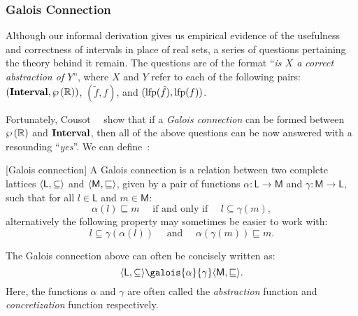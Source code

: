 \subsubsection{Galois Connection}
\label{bg:ssub:galois}

Although our informal derivation gives us empirical evidence of the usefulness
and correctness of intervals in place of real sets, a series of questions
pertaining the theory behind it remain.  The questions are of the format
``\emph{is $X$ a correct abstraction of $Y$}'', where $X$ and $Y$ refer to each
of the following pairs: $(\mathbf{Interval}, \wp\left({\mathbb{R}}\right))$, $(\tilde{f},
f)$, and $(\operatorname{\mathrm{lfp}} (\tilde{f}), \operatorname{\mathrm{lfp}} (f))$.

Fortunately, Cousot~\etal~\cite{cousot77} show that if a \emph{Galois
connection} can be formed between $\wp\left({\mathbb{R}}\right)$ and $\mathbf{Interval}$,
then all of the above questions can be now answered with a resounding
``\emph{yes}''.  We can define~\cite{nielson99}:
\begin{definition}
    \textup{[Galois connection]}
    A Galois connection is a relation between two complete lattices
    $\langle{\mathsf{L}}, {\subseteq}\rangle$ and $\langle{\mathsf{M}}, {\sqsubseteq}\rangle$,
    given by a pair of functions $\alpha: \mathsf{L} \to \mathsf{M}$ and
    $\gamma: \mathsf{M} \to \mathsf{L}$, such that for all $l \in \mathsf{L}$
    and $m \in \mathsf{M}$:
    \begin{equation}
        \alpha (l) \sqsubseteq m
        \quad
        \text{~if and only if~}
        \quad
        l \subseteq \gamma (m),
        \label{bg:eq:galois}
    \end{equation}
    alternatively the following property may sometimes be easier to work with:
    \begin{equation}
        l \subseteq \gamma(\alpha(l))
        \quad
        \text{~and~}
        \quad
        \alpha(\gamma(m)) \sqsubseteq m.
        \label{bg:eq:galois_alt}
    \end{equation}
\end{definition}\vspace{-16.5pt}
The Galois connection above can often be concisely written as:
\begin{equation}
    \lattice{\mathsf{L}}{\subseteq}
        \galois{\alpha}{\gamma}
    \lattice{\mathsf{M}}{\sqsubseteq}.
\end{equation}
Here, the functions $\alpha$ and $\gamma$ are often called the
\emph{abstraction} function and \emph{concretization} function respectively.

